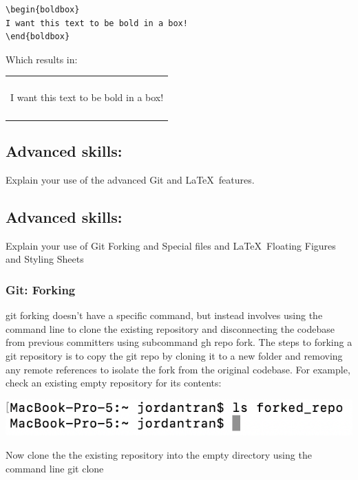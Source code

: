 \documentclass[a4paper, 11pt]{report}
\newenvironment{boldbox}
    {\begin{center}
    \begin{tabular}{|p{0.9\textwidth}|}
    \hline\\
    \bfseries
    }
    { 
    \\\\\hline
    \end{tabular} 
    \end{center}
    }
\begin{document}
\begin{verbatim}
\begin{boldbox}
I want this text to be bold in a box!
\end{boldbox}
\end{verbatim}

Which results in:

\begin{boldbox}
I want this text to be bold in a box!
\end{boldbox}



\newpage

\subsection{Advanced skills: \studB}

Explain your use of the advanced Git and \LaTeX\ features. 

\subsection{Advanced skills: \studC}

Explain your use of Git Forking and Special files and \LaTeX\ Floating Figures and Styling Sheets

\subsubsection{Git: Forking}

git forking doesn't have a specific command, but instead involves using the command line to clone the existing repository and disconnecting the codebase from previous committers using subcommand gh repo fork.  The steps to forking a git repository is to copy the git repo by cloning it to a new folder and removing any remote references to isolate the fork from the original codebase.  \cite{gitfork}  For example,  check an existing empty repository for its contents:

\includegraphics[width=\textwidth]{empty_fork}

Now clone the the existing repository into the empty directory using the command line git clone 
\end{document}

